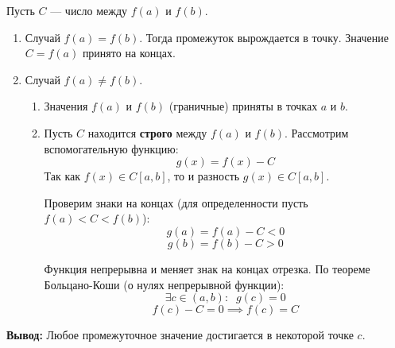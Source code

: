 \begin{tcolorbox}[title=Доказательство]
    Пусть $C$ — число между $f(a)$ и $f(b)$.
    
    \begin{enumerate}
        \item Случай $f(a) = f(b)$. 
        Тогда промежуток вырождается в точку. Значение $C = f(a)$ принято на концах.
        
        \item Случай $f(a) \neq f(b)$.
        \begin{enumerate}
            \item[а)] Значения $f(a)$ и $f(b)$ (граничные) приняты в точках $a$ и $b$.
            
            \item[б)] Пусть $C$ находится \textbf{строго} между $f(a)$ и $f(b)$.
            Рассмотрим вспомогательную функцию:
            \[ g(x) = f(x) - C \]
            Так как $f(x) \in C[a, b]$, то и разность $g(x) \in C[a, b]$.
            
            Проверим знаки на концах (для определенности пусть $f(a) < C < f(b)$):
            \[ g(a) = f(a) - C < 0 \]
            \[ g(b) = f(b) - C > 0 \]
            
            Функция непрерывна и меняет знак на концах отрезка. 
            По теореме Больцано-Коши (о нулях непрерывной функции):
            \[ \exists c \in (a, b): \;\; g(c) = 0 \]
            \[ f(c) - C = 0 \implies f(c) = C \]
        \end{enumerate}
    \end{enumerate}
    \textbf{Вывод:} Любое промежуточное значение достигается в некоторой точке $c$.
\end{tcolorbox}




